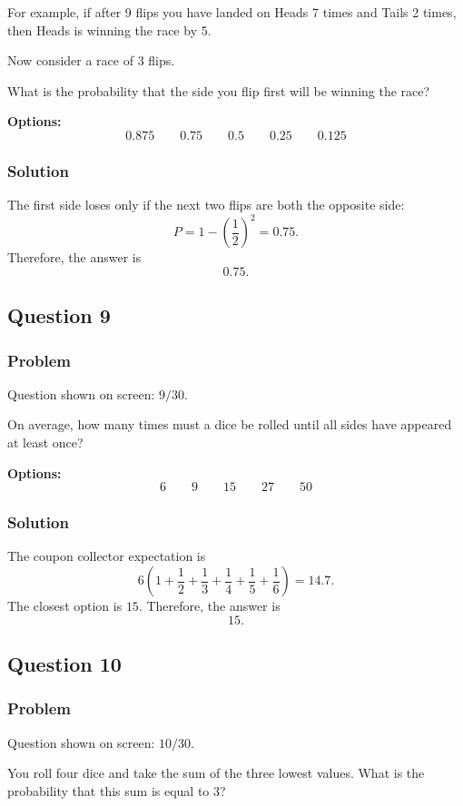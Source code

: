 \documentclass[12pt]{article}
\begin{document}
For example, if after 9 flips you have landed on Heads 7 times and Tails 2 times, then Heads is winning the race by 5.

Now consider a race of 3 flips.

What is the probability that the side you flip first will be winning the race?

\noindent\textbf{Options:}
\[
\boxed{0.875}
\qquad
\boxed{0.75}
\qquad
\boxed{0.5}
\qquad
\boxed{0.25}
\qquad
\boxed{0.125}
\]

\subsubsection{Solution}
The first side loses only if the next two flips are both the opposite side:
\[
P=1-\left(\frac12\right)^2=0.75.
\]
Therefore, the answer is
\[
\boxed{0.75}.
\]

\subsection{Question 9}
\subsubsection{Problem}
Question shown on screen: \(9/30\).

On average, how many times must a dice be rolled until all sides have appeared at least once?

\noindent\textbf{Options:}
\[
\boxed{6}
\qquad
\boxed{9}
\qquad
\boxed{15}
\qquad
\boxed{27}
\qquad
\boxed{50}
\]

\subsubsection{Solution}
The coupon collector expectation is
\[
6\left(1+\frac12+\frac13+\frac14+\frac15+\frac16\right)=14.7.
\]
The closest option is \(15\). Therefore, the answer is
\[
\boxed{15}.
\]

\subsection{Question 10}
\subsubsection{Problem}
Question shown on screen: \(10/30\).

You roll four dice and take the sum of the three lowest values. What is the probability that this sum is equal to 3?
\end{document}
